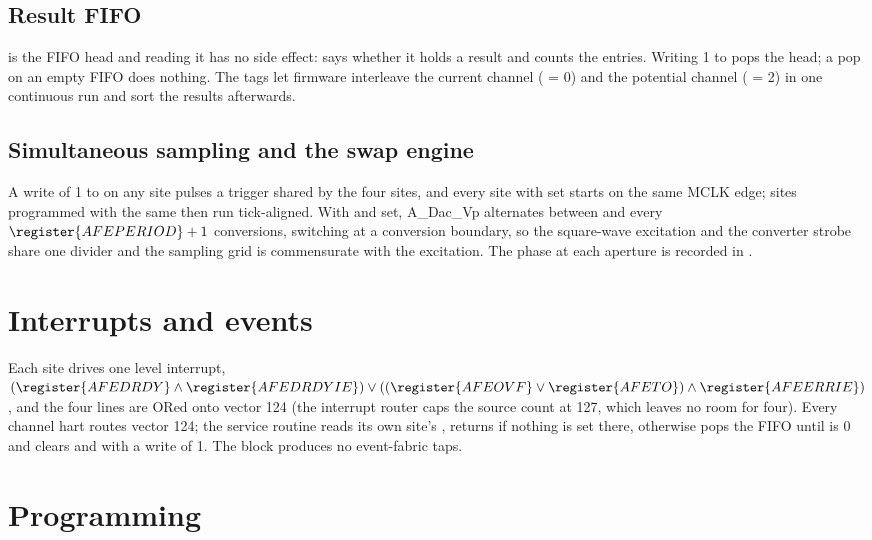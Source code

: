 \subsection{Result FIFO}

 is the FIFO head and reading it has no side effect:  says whether it holds a result and  counts the entries. Writing 1 to  pops the head; a pop on an empty FIFO does nothing. The tags let firmware interleave the current channel ( = 0) and the potential channel ( = 2) in one continuous run and sort the results afterwards.

\subsection{Simultaneous sampling and the swap engine}

A write of 1 to  on any site pulses a trigger shared by the four sites, and every site with  set starts on the same MCLK edge; sites programmed with the same  then run tick-aligned. With  and  set, A\_Dac\_Vp alternates between  and  every $\register{AFEPERIOD} + 1$ conversions, switching at a conversion boundary, so the square-wave excitation and the converter strobe share one divider and the sampling grid is commensurate with the excitation. The phase at each aperture is recorded in .

\section{Interrupts and events}

Each site drives one level interrupt, $(\register{AFEDRDY} \wedge \register{AFEDRDYIE}) \vee ((\register{AFEOVF} \vee \register{AFETO}) \wedge \register{AFEERRIE})$, and the four lines are ORed onto vector 124 (the interrupt router caps the source count at 127, which leaves no room for four). Every channel hart routes vector 124; the service routine reads its own site's , returns if nothing is set there, otherwise pops the FIFO until  is 0 and clears  and  with a write of 1. The block produces no event-fabric taps.

\section{Programming}

